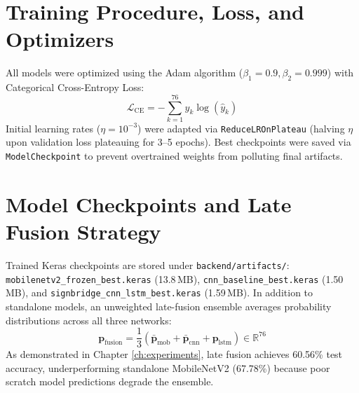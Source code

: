 \section{Training Procedure, Loss, and Optimizers}
\label{sec:training}
All models were optimized using the Adam algorithm \cite{kingma2014adam} ($\beta_1=0.9, \beta_2=0.999$) with Categorical Cross-Entropy Loss:
\begin{equation}
    \mathcal{L}_{\text{CE}} = - \sum_{k=1}^{76} y_k \log(\hat{y}_k)
    \label{eq:ce_loss}
\end{equation}
Initial learning rates ($\eta = 10^{-3}$) were adapted via \texttt{ReduceLROnPlateau} (halving $\eta$ upon validation loss plateauing for 3--5 epochs). Best checkpoints were saved via \texttt{ModelCheckpoint} to prevent overtrained weights from polluting final artifacts.

\section{Model Checkpoints and Late Fusion Strategy}
\label{sec:checkpoints_late_fusion}
Trained Keras checkpoints are stored under \texttt{backend/artifacts/}: \texttt{mobilenetv2\_frozen\_best.keras} (13.8\,MB), \texttt{cnn\_baseline\_best.keras} (1.50\,MB), and \texttt{signbridge\_cnn\_lstm\_best.keras} (1.59\,MB). In addition to standalone models, an unweighted late-fusion ensemble averages probability distributions across all three networks:
\begin{equation}
    \mathbf{p}_{\text{fusion}} = \frac{1}{3} \left( \bar{\mathbf{p}}_{\text{mob}} + \bar{\mathbf{p}}_{\text{cnn}} + \mathbf{p}_{\text{lstm}} \right) \in \mathbb{R}^{76}
    \label{eq:late_fusion}
\end{equation}
As demonstrated in Chapter \ref{ch:experiments}, late fusion achieves 60.56\% test accuracy, underperforming standalone MobileNetV2 (67.78\%) because poor scratch model predictions degrade the ensemble.
